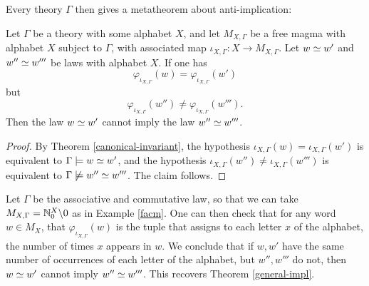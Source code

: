 Every theory $\Gamma$ then gives a metatheorem about anti-implication:

\begin{corollary}\label{anti-impl} Let $\Gamma$ be a theory with some alphabet $X$, and let $M_{X,\Gamma}$ be a free magma with alphabet $X$ subject to $\Gamma$, with associated map $\iota_{X,\Gamma}: X \to M_{X,\Gamma}$.   Let $w \simeq w'$ and $w'' \simeq w'''$ be laws with alphabet $X$.  If one has
$$ \varphi_{\iota_{X,\Gamma}}(w) = \varphi_{\iota_{X,\Gamma}}(w')$$
but
$$ \varphi_{\iota_{X,\Gamma}}(w'') \neq \varphi_{\iota_{X,\Gamma}}(w''').$$
Then the law $w \simeq w'$ cannot imply the law $w'' \simeq w'''$.
\end{corollary}

\begin{proof}  By Theorem \ref{canonical-invariant}, the hypothesis $\iota_{X,\Gamma}(w) = \iota_{X,\Gamma}(w')$ is equivalent to $\Gamma \models w \simeq w'$, and the hypothesis $\iota_{X,\Gamma}(w'') \neq \iota_{X,\Gamma}(w''')$ is equivalent to $\Gamma \not\models w'' \simeq w'''$.  The claim follows.
\end{proof}

\begin{example}  Let $\Gamma$ be the associative and commutative law, so that we can take $M_{X,\Gamma} = \mathbb{N}_0^X \backslash 0$ as in Example \ref{facm}.  One can then check that for any word $w \in M_X$, that $\varphi_{\iota_{X,\Gamma}}(w)$ is the tuple that assigns to each letter $x$ of the alphabet, the number of times $x$ appears in $w$.  We conclude that if $w,w'$ have the same number of occurrences of each letter of the alphabet, but $w'', w'''$ do not, then $w \simeq w'$ cannot imply $w'' \simeq w'''$.  This recovers Theorem \ref{general-impl}.
\end{example}

